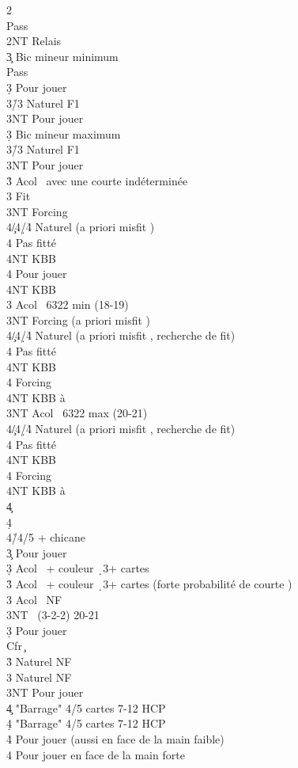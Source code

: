 \documentclass[a4paper]{article}
\begin{document}
\begin{bidtable}
2\s\+\\
Pass\\
2NT \> Relais\+\\
3\c \> Bic mineur minimum\+\\
Pass\\
3\d \> Pour jouer\\
3\h/3\s \> Naturel F1\\
3NT \> Pour jouer\-\\
3\d \> Bic mineur maximum\+\\
3\h/3\s \> Naturel F1\\
3NT \> Pour jouer\-\\
3\h \> Acol \s\ avec une courte indéterminée\+\\
3\s \> Fit \s \\
3NT \> Forcing\\
4\c/4\d/4\h \> Naturel (a priori misfit \s )\+\\
4\s \> Pas fitté\\
4NT \> KBB\-\\
4\s \> Pour jouer\\
4NT \> KBB\-\\
3\s \> Acol \s\ 6322 min (18-19)\+\\
3NT \> Forcing (a priori misfit \s )\\
4\c/4\d/4\h \> Naturel (a priori misfit \s , recherche de fit)\+\\
4\s \> Pas fitté\\
4NT \> KBB\-\\
4\s \> Forcing\\
4NT \> KBB à \s \-\\
3NT \> Acol \s\ 6322 max (20-21)\+\\
4\c/4\d/4\h \> Naturel (a priori misfit \s , recherche de fit)\+\\
4\s \> Pas fitté\\
4NT \> KBB\-\\
4\s \> Forcing\\
4NT \> KBB à \s \-\\
4\c {}\\
4\d {}\\
4\h/4\s {}/5 + chicane\-\\
3\c \> Pour jouer\+\\
3\d \> Acol \s\ + couleur \d\ 3+ cartes\\
3\h \> Acol \s\ + couleur \d\ 3+ cartes (forte probabilité de courte \s )\\
3\s \> Acol \s\ NF\\
3NT \s\ (3-2-2) 20-21\-\\
3\d \> Pour jouer\+\\
Cfr \c \-\\
3\h \> Naturel NF\\
3\s \> Naturel NF\\
3NT \> Pour jouer\\
4\c \> "Barrage" 4/5 cartes 7-12 HCP\\
4\d \> "Barrage" 4/5 cartes 7-12 HCP\\
4\h \> Pour jouer (aussi en face de la main faible)\\
4\s \> Pour jouer en face de la main forte\-
\end{bidtable}
\end{document}
